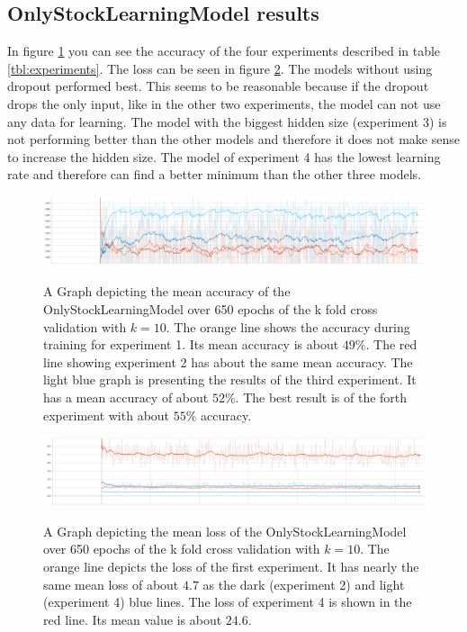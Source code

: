 \subsection{OnlyStockLearningModel results}
In figure \ref{fig:OSLM_k-accuracy} you can see the accuracy of the four experiments described in table \ref{tbl:experiments}. The loss can be seen in figure \ref{fig:OSLM_k-loss}. The models without using dropout performed best. This seems to be reasonable because if the dropout drops the only input, like in the other two experiments, the model can not use any data for learning. The model with the biggest hidden size (experiment 3) is not performing better than the other models and therefore it does not make sense to increase the hidden size. The model of experiment 4 has the lowest learning rate and therefore can find a better minimum than the other three models.\\
\begin{figure}[tb]
	\caption{A Graph depicting the mean accuracy of the OnlyStockLearningModel over 650 epochs of the k fold cross validation with $k=10$. The orange line shows the accuracy during training for experiment 1. Its mean accuracy is about $49\%$. The red line showing experiment 2 has about the same mean accuracy. The light blue graph is presenting the results of the third experiment. It has a mean accuracy of about $52\%$. The best result is of the forth experiment with about $55\%$ accuracy.}
	\includegraphics[width=0.95\linewidth]{images/OSLM_k-accuracy.PNG}
	\label{fig:OSLM_k-accuracy}
\end{figure}
\begin{figure}[tb]
	\caption{A Graph depicting the mean loss of the OnlyStockLearningModel over 650 epochs of the k fold cross validation with $k=10$. The orange line depicts the loss of the first experiment. It has nearly the same mean loss of about $4.7$ as the dark (experiment 2) and light (experiment 4) blue lines. The loss of experiment 4 is shown in the red line. Its mean value is about $24.6$.}
	\includegraphics[width=0.95\linewidth]{images/OSLM_k-loss.PNG}
	\label{fig:OSLM_k-loss}
\end{figure}
